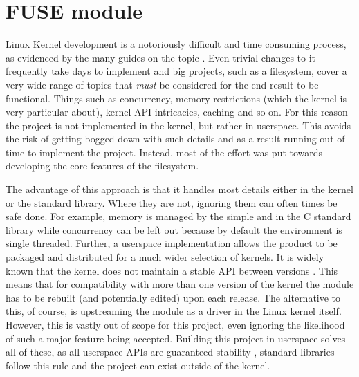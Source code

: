     \section{FUSE module}
        \label{sec:FUSE}

        Linux Kernel development is a notoriously difficult and time consuming
        process, as evidenced by the many guides on the topic
        \cite{kernelnewbies_developer, Linux_howto}. Even trivial changes
        to it frequently take days to implement and big projects, such as a
        filesystem, cover a very wide range of topics that \textit{must} be
        considered for the end result to be functional. Things such as
        concurrency, memory restrictions (which the kernel is very particular
        about), kernel API intricacies, caching and so on. For this reason the
        project is not implemented in the kernel, but rather in userspace. This
        avoids the risk of getting bogged down with such details and as a
        result running out of time to implement the project. Instead, most of
        the effort was put towards developing the core features of the
        filesystem.

        The advantage of this approach is that it handles most details either
        in the kernel or the standard library. Where they are not, ignoring
        them can often times be safe done. For example, memory is managed by
        the simple  and  in the C standard
        library while concurrency can be left out because by default the
        environment is single threaded. Further, a userspace
        implementation allows the product to be packaged and distributed for a
        much wider selection of kernels. It is widely known that the kernel
        does not maintain a stable API between versions
        \cite{Linux_stable_api}. This means that for compatibility with more
        than one version of the kernel the module has to be rebuilt (and
        potentially edited) upon each release. The alternative to this, of
        course, is upstreaming the module as a driver in the Linux kernel
        itself. However, this is vastly out of scope for this project, even ignoring
        the likelihood of such a major feature being accepted. Building
        this project in userspace solves all of these, as all userspace APIs are
        guaranteed stability \cite{never_break_userspace}, standard
        libraries follow this rule and the project can exist outside of the kernel.

